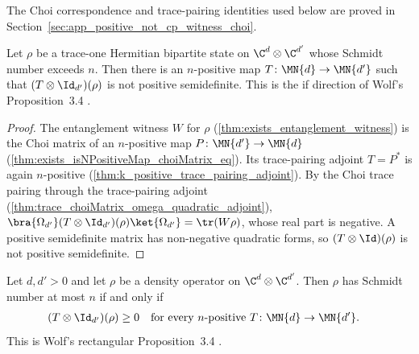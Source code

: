 The Choi correspondence and trace-pairing identities used below are proved in
Section~\ref{sec:app_positive_not_cp_witness_choi}.

\begin{theorem}
    \label{thm:exists_isNPositiveMap_detects}
    \leanok
    Let $\rho$ be a trace-one Hermitian bipartite state on
    $\C^d\otimes\C^{d'}$ whose Schmidt number exceeds $n$. Then there is an
    $n$-positive map $T\colon\MN{d}\to\MN{d'}$ such that
    $(T\otimes\Id_{d'})(\rho)$ is not positive semidefinite. This is the if
    direction of Wolf's Proposition~3.4
    \cite[Chapter~3, Proposition~3.4, Equations~(3.13)--(3.14)]{Wolf2012Quantum}.
\end{theorem}

\begin{proof}
    \leanok
    The entanglement witness $W$ for $\rho$ (\ref{thm:exists_entanglement_witness}) is the
    Choi matrix of an $n$-positive map $P\colon\MN{d'}\to\MN{d}$
    (\ref{thm:exists_isNPositiveMap_choiMatrix_eq}).
    Its trace-pairing adjoint $T=P^{*}$ is again $n$-positive
    (\ref{thm:k_positive_trace_pairing_adjoint}). By the Choi trace pairing through the
    trace-pairing adjoint (\ref{thm:trace_choiMatrix_omega_quadratic_adjoint}),
    $\bra{\Omega_{d'}}(T\otimes\Id_{d'})(\rho)\ket{\Omega_{d'}}=\tr(W\rho)$,
    whose real part is
    negative. A positive semidefinite matrix has non-negative quadratic forms, so
    $(T\otimes\Id)(\rho)$ is not positive semidefinite.
\end{proof}

\begin{theorem}
    \label{thm:schmidt_number_iff_positive_maps}
    \leanok
    Let $d,d'>0$ and let $\rho$ be a density operator on
    $\C^d\otimes\C^{d'}$. Then $\rho$ has Schmidt number at most $n$ if and only if
    \begin{align}
        (T\otimes\Id_{d'})(\rho)&\ge0
        &&\text{for every $n$-positive }T\colon\MN{d}\to\MN{d'}.
        \notag
    \end{align}
    This is Wolf's rectangular Proposition~3.4
    \cite[Chapter~3, Proposition~3.4]{Wolf2012Quantum}.
\end{theorem}

